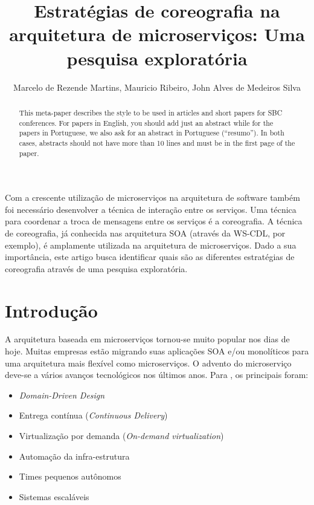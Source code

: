 \documentclass[12pt]{article}
\title{Estratégias de coreografia na arquitetura de microserviços: Uma pesquisa exploratória}
\author{Marcelo de Rezende Martins\inst{1}, Mauricio Ribeiro\inst{1}, John Alves de Medeiros Silva\inst{1} }
\theoremstyle{plain}
\begin{document}
 

\maketitle

\begin{abstract}
  This meta-paper describes the style to be used in articles and short papers
  for SBC conferences. For papers in English, you should add just an abstract
  while for the papers in Portuguese, we also ask for an abstract in
  Portuguese (``resumo''). In both cases, abstracts should not have more than
  10 lines and must be in the first page of the paper.
\end{abstract}
     
\begin{resumo} 
  Com a crescente utilização de microserviços na arquitetura de software também foi necessário desenvolver a técnica de interação entre os serviços. Uma técnica para coordenar a troca de mensagens entre os serviços é a coreografia. A técnica de coreografia, já conhecida nas arquitetura SOA (através da WS-CDL, por exemplo), é amplamente utilizada na arquitetura de microserviços. Dado a sua importância, este artigo busca identificar quais são as diferentes estratégias de coreografia através de uma pesquisa exploratória. 
\end{resumo}


\section{Introdução}
\label{sec:introducao}

A arquitetura baseada em microserviços tornou-se muito popular nos dias de hoje. Muitas empresas estão migrando suas aplicações SOA e/ou monolíticos para uma arquitetura mais flexível como microserviços. O advento do microserviço deve-se a vários avanços tecnológicos nos últimos anos. Para \cite{Newman:15}, os principais foram:
\begin{itemize}
    \item \textit{Domain-Driven Design}
    \item Entrega contínua (\textit{Continuous Delivery})
    \item Virtualização por demanda (\textit{On-demand virtualization})
    \item Automação da infra-estrutura
    \item Times pequenos autônomos
    \item Sistemas escaláveis
\end{itemize}
\end{document}
